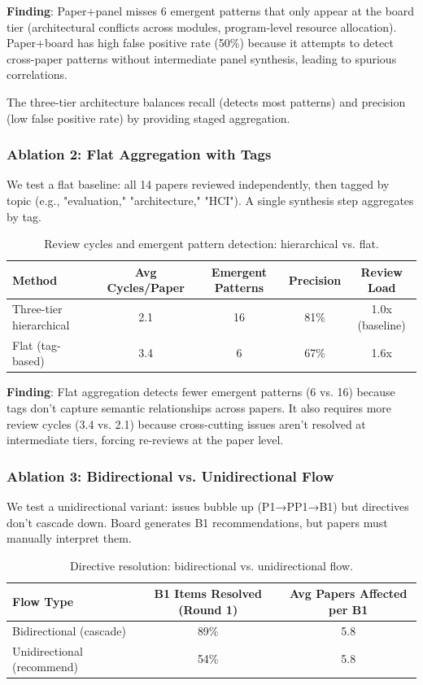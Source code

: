 \textbf{Finding}: Paper+panel misses 6 emergent patterns that only appear at the board tier (architectural conflicts across modules, program-level resource allocation). Paper+board has high false positive rate (50\%) because it attempts to detect cross-paper patterns without intermediate panel synthesis, leading to spurious correlations.

The three-tier architecture balances recall (detects most patterns) and precision (low false positive rate) by providing staged aggregation.

\subsubsection{Ablation 2: Flat Aggregation with Tags}

We test a flat baseline: all 14 papers reviewed independently, then tagged by topic (e.g., "evaluation," "architecture," "HCI"). A single synthesis step aggregates by tag.

\begin{table}[t]
\centering
\caption{Review cycles and emergent pattern detection: hierarchical vs. flat.}
\label{tab:ablation-flat}
\begin{tabular}{lcccc}
\toprule
Method & Avg Cycles/Paper & Emergent Patterns & Precision & Review Load \\
\midrule
Three-tier hierarchical & 2.1 & 16 & 81\% & 1.0x (baseline) \\
Flat (tag-based) & 3.4 & 6 & 67\% & 1.6x \\
\bottomrule
\end{tabular}
\end{table}

\textbf{Finding}: Flat aggregation detects fewer emergent patterns (6 vs. 16) because tags don't capture semantic relationships across papers. It also requires more review cycles (3.4 vs. 2.1) because cross-cutting issues aren't resolved at intermediate tiers, forcing re-reviews at the paper level.

\subsubsection{Ablation 3: Bidirectional vs. Unidirectional Flow}

We test a unidirectional variant: issues bubble up (P1→PP1→B1) but directives don't cascade down. Board generates B1 recommendations, but papers must manually interpret them.

\begin{table}[t]
\centering
\caption{Directive resolution: bidirectional vs. unidirectional flow.}
\label{tab:ablation-flow}
\begin{tabular}{lcc}
\toprule
Flow Type & B1 Items Resolved (Round 1) & Avg Papers Affected per B1 \\
\midrule
Bidirectional (cascade) & 89\% & 5.8 \\
Unidirectional (recommend) & 54\% & 5.8 \\
\bottomrule
\end{tabular}
\end{table}

